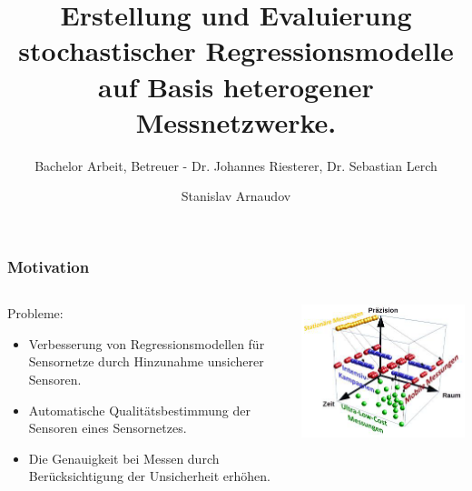 \documentclass[18pt]{beamer}
\title[Short title]{Erstellung und Evaluierung stochastischer Regressionsmodelle auf Basis heterogener Messnetzwerke.}
\subtitle{Bachelor Arbeit, Betreuer - Dr. Johannes Riesterer, Dr. Sebastian Lerch}
\author{Stanislav Arnaudov}
\institute{TECO - Das Telecooperation Office}
\begin{document}
 



\begin{frame}
 \titlepage
\end{frame}

\begin{frame}
  \frametitle{Motivation}
  
  \begin{columns}
    \begin{column}{0.4\textwidth}
      Probleme:
      \begin{itemize}
      \item Verbesserung von Regressionsmodellen für Sensornetze  durch Hinzunahme unsicherer Sensoren.
      \item Automatische Qualitätsbestimmung der Sensoren eines Sensornetzes.
      \item Die Genauigkeit bei Messen durch Berücksichtigung der Unsicherheit erhöhen.
      \end{itemize}
    \end{column}
    \begin{column}{0.6\textwidth}
      \begin{center}
        \includegraphics[scale=0.5]{images/motivation}
      \end{center}
    \end{column}
  \end{columns}
  
\end{frame}
\end{document}
